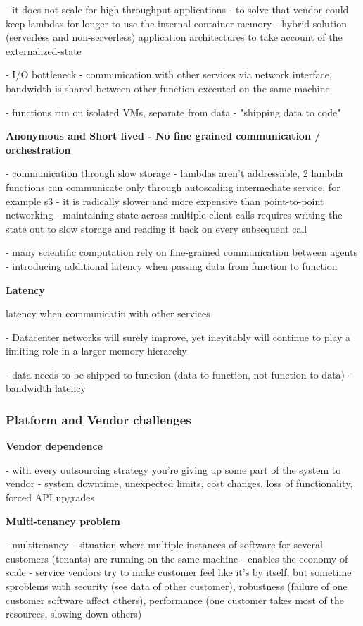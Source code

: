 - it does not scale for high throughput applications - to solve that vendor could keep lambdas for longer to use the internal container memory
- hybrid solution (serverless and non-serverless) application architectures to take account of the externalized-state

- I/O bottleneck - communication with other services via network interface, bandwidth is shared between other function executed on the same machine

- functions run on isolated VMs, separate from data - "shipping data to code"


\textbf{Anonymous and Short lived - No fine grained communication / orchestration} 

- communication through slow storage - lambdas aren't addressable, 2 lambda functions can communicate only through autoscaling intermediate service, for example s3 - it is radically slower and more expensive than point-to-point networking - maintaining state across multiple client calls requires writing the state out to slow storage and reading it back on every subsequent call

- many scientific computation rely on fine-grained communication between agents - introducing additional latency when passing data from function to function

\textbf{Latency} 

latency when communicatin with other services

- Datacenter networks will surely improve, yet inevitably will continue to play a limiting role in a larger memory hierarchy

- data needs to be shipped to function (data to function, not function to data) - bandwidth latency

\subsubsection*{Platform and Vendor challenges} 

\textbf{Vendor dependence} 

- with every outsourcing strategy you're giving up some part of the system to vendor - system downtime, unexpected limits, cost changes, loss of functionality, forced API upgrades

\textbf{Multi-tenancy problem} 

- multitenancy - situation where multiple instances of software for several customers (tenants) are running on the same machine - enables the economy of scale
- service vendors try to make customer feel like it's by itself, but sometime sproblems with security (see data of other customer), robustness (failure of one customer software affect others), performance (one customer takes most of the resources, slowing down others)

